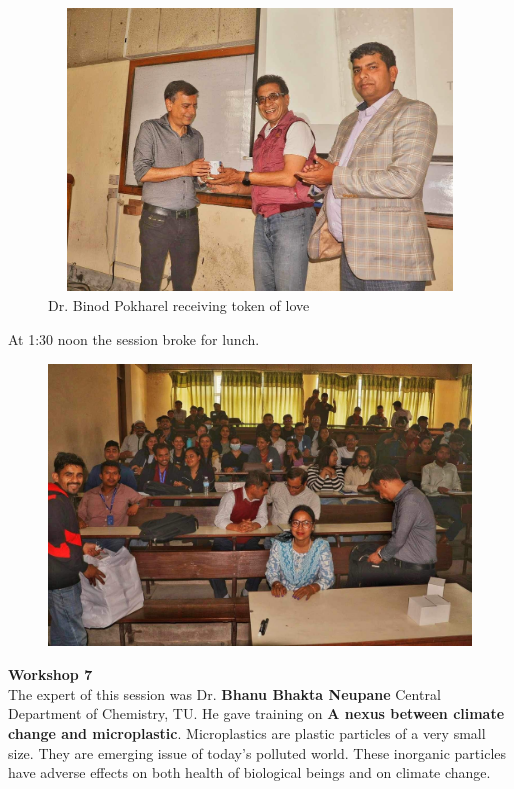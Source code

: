 \documentclass[a4paper,12pt]{report}
\begin{document}
\begin{figure}[h!]
  \centering
  \includegraphics[width=12cm, height=7.5cm]{binod.jpeg}
  \caption{Dr. Binod Pokharel receiving token of love}
\end{figure}

\vspace{7mm}

At 1:30 noon the session broke for lunch.
\vspace{5mm}

\begin{figure}[h!]
  \centering
  \includegraphics[width=13cm, height=7.5cm]{lunch1.jpeg}
\end{figure}
\clearpage

{\bfseries \large Workshop 7}\\[3mm]
The expert of this session was Dr. \textbf{Bhanu Bhakta Neupane} Central Department of Chemistry, TU. He gave training on \textbf{A nexus between climate change and microplastic}. Microplastics are plastic particles of a very small size. They are emerging issue of today's polluted world. These inorganic particles have adverse effects on both health of biological beings and on climate change.
\end{document}

